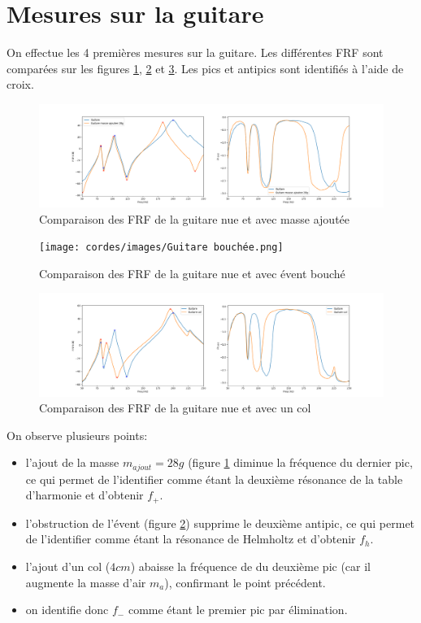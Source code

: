 \documentclass[atiam, article]{rapport} %
\begin{document}
\section{Mesures sur la guitare}
On effectue les 4 premières mesures sur la guitare. Les différentes FRF sont comparées sur les figures \ref{fig:frf-guitare-masse}, \ref{fig:frf-guitare-bouchee} et \ref{fig:frf-guitare-col}. Les pics et antipics sont identifiés à l'aide de croix.

\begin{figure}
    \centering
    \includegraphics[width=\textwidth]{cordes/images/Guitare masse ajoutee 28g.png}
    \caption{Comparaison des FRF de la guitare nue et avec masse ajoutée}
    \label{fig:frf-guitare-masse}
\end{figure}

\begin{figure}
    \centering
    \texttt{[image: cordes/images/Guitare bouchée.png]}
    \caption{Comparaison des FRF de la guitare nue et avec évent bouché}
    \label{fig:frf-guitare-bouchee}
\end{figure}

\begin{figure}
    \centering
    \includegraphics[width=\textwidth]{cordes/images/Guitare col.png}
    \caption{Comparaison des FRF de la guitare nue et avec un col}
    \label{fig:frf-guitare-col}
\end{figure}

On observe plusieurs points:
\begin{itemize}
    \item l'ajout de la masse $m_{ajout} = 28 \si{g}$ (figure \ref{fig:frf-guitare-masse} diminue la fréquence du dernier pic, ce qui permet de l'identifier comme étant la deuxième résonance de la table d'harmonie et d'obtenir $f_+$.
    \item l'obstruction de l'évent (figure \ref{fig:frf-guitare-bouchee}) supprime le deuxième antipic, ce qui permet de l'identifier comme étant la résonance de Helmholtz et d'obtenir $f_h$.
    \item l'ajout d'un col ($4\si{cm}$) abaisse la fréquence de du deuxième pic (car il augmente la masse d'air $m_a$), confirmant le point précédent.
    \item on identifie donc $f_-$ comme étant le premier pic par élimination.
\end{itemize}
\end{document}
